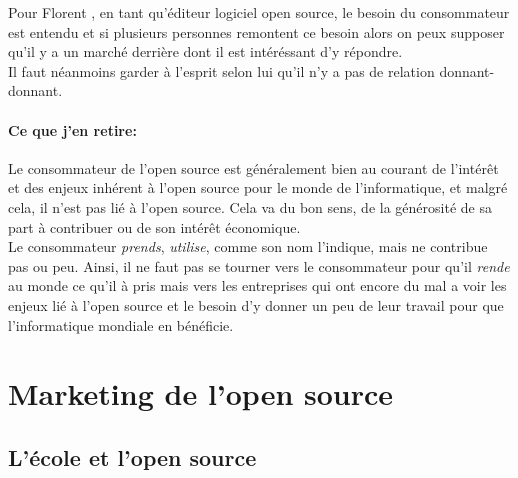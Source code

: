 			\begin{center}
				\textit{
				}
			\end{center}

			Pour Florent , en tant qu'éditeur logiciel open source, le besoin du consommateur est entendu et si plusieurs personnes remontent ce besoin alors on peux supposer qu'il y a un marché derrière dont il est intéréssant d'y répondre.\\

			Il faut néanmoins garder à l'esprit selon lui qu'il n'y a pas de relation donnant-donnant.

			\begin{center}
				\textit{
				}
			\end{center}

		\paragraph{Ce que j'en retire:\\}

		Le consommateur de l'open source est généralement bien au courant de l'intérêt et des enjeux inhérent à l'open source pour le monde de l'informatique, et malgré cela, il n'est pas lié à l'open source. Cela va du bon sens, de la générosité de sa part à contribuer ou de son intérêt économique.\\

		Le consommateur \emph{prends}, \emph{utilise}, comme son nom l'indique, mais ne contribue pas ou peu. Ainsi, il ne faut pas se tourner vers le consommateur pour qu'il \emph{rende} au monde ce qu'il à pris mais vers les entreprises qui ont encore du mal a voir les enjeux lié à l'open source et le besoin d'y donner un peu de leur travail pour que l'informatique mondiale en bénéficie.

	\section{Marketing de l'open source}

		\subsection{L'école et l'open source}


